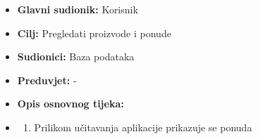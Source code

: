 						
						
	
								
								
							

                        \noindent {}
					\begin{itemize}
	
						\item \textbf{Glavni sudionik: }Korisnik
						\item  \textbf{Cilj:} Pregledati proizvode i ponude
						\item  \textbf{Sudionici:} Baza podataka
						\item  \textbf{Preduvjet:} -
						\item  \textbf{Opis osnovnog tijeka:}
						
						\item[] \begin{enumerate}
							\item Prilikom učitavanja aplikacije prikazuje se ponuda\\
						\end{enumerate}
						
					\end{itemize}


